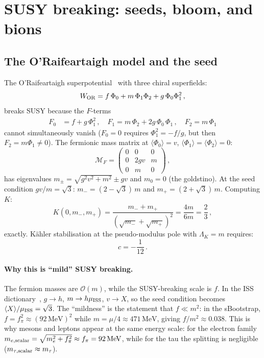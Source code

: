 \documentclass[aps,prd,twocolumn,showpacs,preprintnumbers,superscriptaddress,floatfix]{revtex4-2}
\newcommand{\MeV}{\,\mathrm{MeV}}
\begin{document}
\section{SUSY breaking: seeds, bloom, and bions}
\label{sec:susy_breaking}

\subsection{The O'Raifeartaigh model and the seed}

The O'Raifeartaigh superpotential~\cite{ORaifeartaigh:1975}
with three chiral superfields:
\begin{equation}
  W_{\rm OR} = f\,\Phi_0 + m\,\Phi_1\Phi_2
  + g\,\Phi_0\Phi_1^2\,,
  \label{eq:W_OR}
\end{equation}
breaks SUSY because the $F$-terms
\begin{align}
  F_0 &= f + g\,\Phi_1^2\,,\quad
  F_1 = m\,\Phi_2 + 2g\,\Phi_0\,\Phi_1\,,\quad
  F_2 = m\,\Phi_1
\end{align}
cannot simultaneously vanish ($F_0 = 0$ requires
$\Phi_1^2 = -f/g$, but then $F_2 = m\Phi_1 \neq 0$).
The fermionic mass matrix at
$\langle\Phi_0\rangle = v$,
$\langle\Phi_1\rangle = \langle\Phi_2\rangle = 0$:
\begin{equation}
  \mathcal{M}_F = \begin{pmatrix}
    0 & 0 & 0 \\ 0 & 2gv & m \\ 0 & m & 0
  \end{pmatrix}\,,
  \label{eq:fermion_mass_matrix}
\end{equation}
has eigenvalues $m_\pm = \sqrt{g^2v^2 + m^2} \pm gv$ and
$m_0 = 0$ (the goldstino).
At the seed condition $gv/m = \sqrt{3}$:
$m_- = (2-\sqrt{3})\,m$ and $m_+ = (2+\sqrt{3})\,m$.
Computing $K$:
\begin{equation}
  K(0, m_-, m_+) = \frac{m_- + m_+}{(\sqrt{m_-}+\sqrt{m_+})^2}
  = \frac{4m}{6m} = \frac{2}{3}\,,
\end{equation}
exactly.
K\"ahler stabilisation at the pseudo-modulus pole with
$\Lambda_K = m$ requires:
\begin{equation}
  c = -\frac{1}{12}\,.
  \label{eq:c_12}
\end{equation}

\paragraph{Why this is ``mild'' SUSY breaking.}
The fermion masses are $\mathcal{O}(m)$, while the SUSY-breaking
scale is $f$.
In the ISS dictionary~\cite{ISS:2006}, $g \to h$,
$m \to h\mu_{\rm ISS}$, $v \to X$, so the seed condition becomes
$\langle X\rangle/\mu_{\rm ISS} = \sqrt{3}$.
The ``mildness'' is the statement that $f \ll m^2$: in the
sBootstrap, $f = f_\pi^2 \approx (92\MeV)^2$ while
$m = \mu/4 \approx 471\MeV$, giving $f/m^2 \approx 0.038$.
This is why mesons and leptons appear at the same energy scale:
for the electron family
$m_{e,\rm scalar} = \sqrt{m_e^2 + f_\pi^2} \approx f_\pi
= 92\MeV$, while for the tau the splitting is negligible
($m_{\tau,\rm scalar} \approx m_\tau$).
\end{document}
